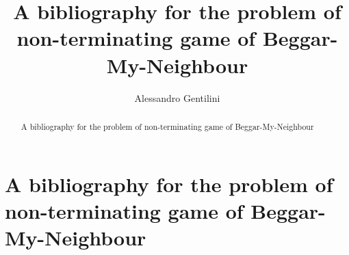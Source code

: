 \documentclass[a4paper,12pt]{article}
\title{A bibliography for the problem of non-terminating game of Beggar-My-Neighbour}
\author{Alessandro Gentilini}
\begin{document}
\maketitle

\begin{abstract}
A bibliography for the problem of non-terminating game of Beggar-My-Neighbour
\end{abstract} 

\section{A bibliography for the problem of non-terminating game of Beggar-My-Neighbour}

\cite{paulhus1999beggar}




\end{document}
